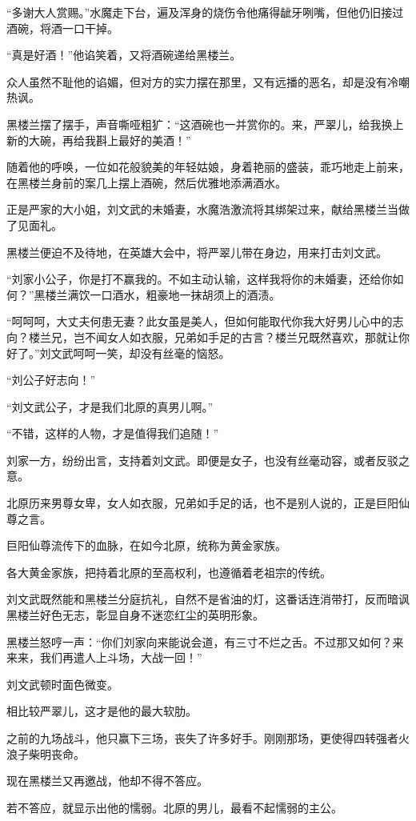 \begin{this_body}
“多谢大人赏赐。”水魔走下台，遍及浑身的烧伤令他痛得龇牙咧嘴，但他仍旧接过酒碗，将酒一口干掉。

“真是好酒！”他谄笑着，又将酒碗递给黑楼兰。

众人虽然不耻他的谄媚，但对方的实力摆在那里，又有远播的恶名，却是没有冷嘲热讽。

黑楼兰摆了摆手，声音嘶哑粗犷：“这酒碗也一并赏你的。来，严翠儿，给我换上新的大碗，再给我斟上最好的美酒！”

随着他的呼唤，一位如花般貌美的年轻姑娘，身着艳丽的盛装，乖巧地走上前来，在黑楼兰身前的案几上摆上酒碗，然后优雅地添满酒水。

正是严家的大小姐，刘文武的未婚妻，水魔浩激流将其绑架过来，献给黑楼兰当做了见面礼。

黑楼兰便迫不及待地，在英雄大会中，将严翠儿带在身边，用来打击刘文武。

“刘家小公子，你是打不赢我的。不如主动认输，这样我将你的未婚妻，还给你如何？”黑楼兰满饮一口酒水，粗豪地一抹胡须上的酒渍。

“呵呵呵，大丈夫何患无妻？此女虽是美人，但如何能取代你我大好男儿心中的志向？楼兰兄，岂不闻女人如衣服，兄弟如手足的古言？楼兰兄既然喜欢，那就让你好了。”刘文武呵呵一笑，却没有丝毫的恼怒。

“刘公子好志向！”

“刘文武公子，才是我们北原的真男儿啊。”

“不错，这样的人物，才是值得我们追随！”

刘家一方，纷纷出言，支持着刘文武。即便是女子，也没有丝毫动容，或者反驳之意。

北原历来男尊女卑，女人如衣服，兄弟如手足的话，也不是别人说的，正是巨阳仙尊之言。

巨阳仙尊流传下的血脉，在如今北原，统称为黄金家族。

各大黄金家族，把持着北原的至高权利，也遵循着老祖宗的传统。

刘文武既然能和黑楼兰分庭抗礼，自然不是省油的灯，这番话连消带打，反而暗讽黑楼兰好色无志，彰显自身不迷恋红尘的英明形象。

黑楼兰怒哼一声：“你们刘家向来能说会道，有三寸不烂之舌。不过那又如何？来来来，我们再遣人上斗场，大战一回！”

刘文武顿时面色微变。

相比较严翠儿，这才是他的最大软肋。

之前的九场战斗，他只赢下三场，丧失了许多好手。刚刚那场，更使得四转强者火浪子柴明丧命。

现在黑楼兰又再邀战，他却不得不答应。

若不答应，就显示出他的懦弱。北原的男儿，最看不起懦弱的主公。


\end{this_body}

